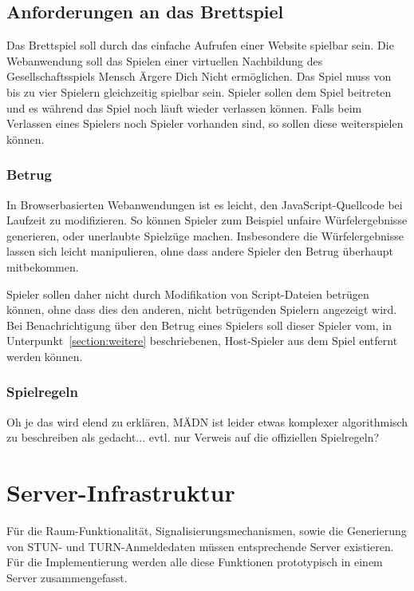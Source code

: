 \subsection{Anforderungen an das Brettspiel}
Das Brettspiel soll durch das einfache Aufrufen einer Website spielbar sein. Die Webanwendung soll das Spielen einer virtuellen Nachbildung des Gesellschaftsspiels \glqq{}Mensch Ärgere Dich Nicht\grqq{} ermöglichen. Das Spiel muss von bis zu vier Spielern gleichzeitig spielbar sein. Spieler sollen dem Spiel beitreten und es während das Spiel noch läuft wieder verlassen können. Falls beim Verlassen eines Spielers noch Spieler vorhanden sind, so sollen diese weiterspielen können. 

\subsubsection{Betrug}
In Browserbasierten Webanwendungen ist es leicht, den JavaScript-Quellcode bei Laufzeit zu modifizieren. So können Spieler zum Beispiel unfaire Würfelergebnisse generieren, oder unerlaubte Spielzüge machen. Insbesondere die Würfelergebnisse lassen sich leicht manipulieren, ohne dass andere Spieler den Betrug überhaupt mitbekommen.\par

Spieler sollen daher nicht durch Modifikation von Script-Dateien betrügen können, ohne dass dies den anderen, nicht betrügenden Spielern angezeigt wird. Bei Benachrichtigung über den Betrug eines Spielers soll dieser Spieler vom, in Unterpunkt~\ref{section:weitere} beschriebenen, \glqq{}Host\grqq{}-Spieler aus dem Spiel entfernt werden können.\par

\subsubsection{Spielregeln}
Oh je das wird elend zu erklären, MÄDN ist leider etwas komplexer algorithmisch zu beschreiben als gedacht... evtl. nur Verweis auf die offiziellen Spielregeln?

\section{Server-Infrastruktur}
Für die Raum-Funktionalität, Signalisierungsmechanismen, sowie die Generierung von STUN- und TURN-Anmeldedaten müssen entsprechende Server existieren. Für die Implementierung werden alle diese Funktionen prototypisch in einem Server zusammengefasst.

